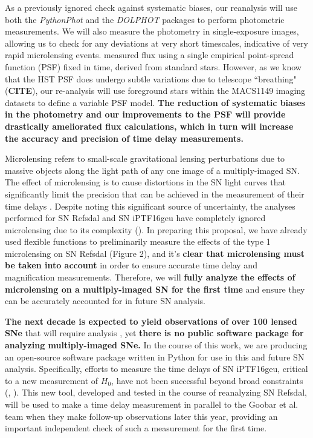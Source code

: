 As a previously ignored check against systematic biases, our reanalysis will use both the \textit{PythonPhot} and the \textit{DOLPHOT} packages to 
perform photometric measurements. We will also measure the photometry in single-exposure images, allowing us to check for any deviations 
at very short timescales, indicative of very rapid microlensing events. \cite{Rodney:2016} measured flux using a single empirical 
point-spread function (PSF) fixed in time, derived from standard stars. However, as we know that the HST PSF does undergo 
subtle variations due to telescope ``breathing" (\textbf{CITE}), our re-analysis will use foreground stars within the MACS1149 imaging 
datasets to define a variable PSF model. \textbf{The reduction of systematic biases in the photometry and our improvements to the 
PSF will provide drastically ameliorated flux calculations, which in turn will increase the accuracy and precision of time delay measurements.}

Microlensing refers to small-scale gravitational lensing
perturbations due to massive objects along the light path of any one image of a
multiply-imaged SN. The effect of microlensing is to cause distortions in the SN light
curves that significantly limit the precision that can be achieved in the measurement of 
their time delays \citep{Dobler:2006}. Despite noting this significant source of uncertainty, the analyses performed for SN Refsdal and SN iPTF16geu 
have completely ignored microlensing due to its complexity (\cite{More:2016,Rodney:2016}). In preparing this proposal, we have already 
used flexible functions to preliminarily measure the effects of the type 1 microlensing on SN Refsdal (Figure 2), and it's 
\textbf{clear that microlensing must be taken into account} in order to ensure accurate time delay and magnification measurements. 
Therefore, we will \textbf{fully analyze the effects of microlensing on a multiply-imaged SN for the first time} and ensure they can be accurately
accounted for in future SN analysis.

\textbf{The next decade is expected to yield observations
of over 100 lensed SNe} that will require analysis \citep{Oguri:2010},
yet \textbf{there is no public software package for analyzing multiply-imaged SNe.}
In the course of this work, we are producing an open-source software package written 
in Python for use in this and future SN analysis. Specifically, efforts to measure the time 
delays of SN iPTF16geu, critical to a new measurement of $H_0$, have not been 
successful beyond broad constraints (\cite{Goobar:2016}, \cite{More:2016}). This new tool,
developed and tested in the course of reanalyzing SN Refsdal, will be used to make a time 
delay measurement in parallel to the Goobar et al. team when they make follow-up observations
later this year, providing an important independent check of such a measurement for the first time. 

